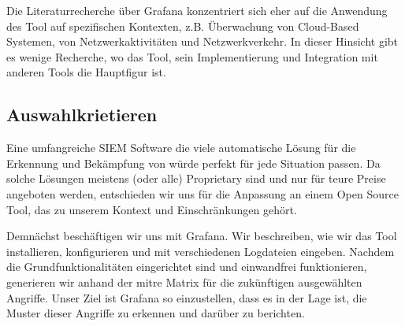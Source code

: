 Die Literaturrecherche über Grafana konzentriert sich eher auf die Anwendung des Tool auf spezifischen Kontexten, z.B. Überwachung von Cloud-Based Systemen, von Netzwerkaktivitäten und Netzwerkverkehr. In dieser Hinsicht gibt es wenige Recherche, wo das Tool, sein Implementierung und Integration mit anderen Tools die Hauptfigur ist.

\subsection{Auswahlkrietieren}
Eine umfangreiche \gls{SIEM} Software die viele automatische Lösung für die Erkennung und Bekämpfung von  würde perfekt für jede Situation passen. Da solche Lösungen meistens (oder alle) \gls{Proprietary} sind und nur für teure Preise angeboten werden, entschieden wir uns für die Anpassung an einem \gls{Open Source} Tool, das zu unserem Kontext und Einschränkungen gehört. 

Demnächst beschäftigen wir uns mit Grafana. Wir beschreiben, wie wir das Tool installieren, konfigurieren und mit verschiedenen Logdateien eingeben. Nachdem die Grundfunktionalitäten eingerichtet sind und einwandfrei funktionieren, generieren wir anhand der \gls{mitre} Matrix  für die zukünftigen ausgewählten Angriffe. Unser Ziel ist Grafana so einzustellen, dass es in der Lage ist, die Muster dieser Angriffe zu erkennen und darüber zu berichten.